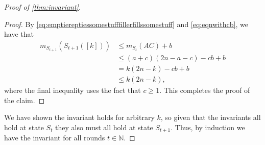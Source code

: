 \begin{proof}[Proof of \cref{thm:invariant}]
\begin{proof}
By \eqref{eq:emptiereptiessomestufffillerfillssomestuff} and \eqref{eq:eqnwithcb}, we have that
\begin{align*}
    m_{S_{t+1}}(S_{t + 1}([k])) & \le m_{S_t}(AC) + b \\
                                & \le (a+c)(2n-a-c) - cb + b \\
                                & = k(2n-k) - cb + b \\
                                & \le k(2n-k),
\end{align*}
where the final inequality uses the fact that $c \ge 1$. This completes the proof of the claim. 
  
\end{proof}

We have shown the invariant holds for arbitrary $k$, so given that the
invariants all hold at state $S_t$ they also must all hold at state $S_{t+1}$.
Thus, by induction we have the invariant for all rounds $t\in\mathbb{N}$.
\end{proof}

